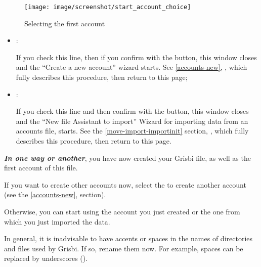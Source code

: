 \begin{enumerate}
\begin{figure}[htbp]
\begin{center}
\texttt{[image: image/screenshot/start\_account\_choice]}
\end{center}
\caption{Selecting the first account}
\label{start-account-choice-img}
\end{figure}


		\begin{itemize}
			\item {}:\par
			If you check this line, then if you confirm with the  button, this window closes and the \enquote{Create a new account} wizard starts. See \vref{accounts-new}, , which fully describes this procedure, then return to this page;

			\item {}:\par
			If you check this line and then confirm with the  button, this window closes and the \enquote{New file Assistant to import} Wizard for importing data from an accounts file, starts. See the \vref{move-import-importinit} section, , which fully describes this procedure, then return to this page.
\end{itemize}
\end{enumerate}

\label{start-newfile-end}

\textit{\textbf{In one way or another}}, you have now created your Grisbi file, as well as the first account of this file.


If you want to create other accounts now, select the  to create another account (see the \vref{accounts-new},  section).


Otherwise, you can start using the account you just created or the one from which you just imported the data.


In general, it is inadvisable to have accents or spaces in the names of directories and files used by Grisbi. If so, rename them now. For example, spaces can be replaced by underscores (\underline{}).

